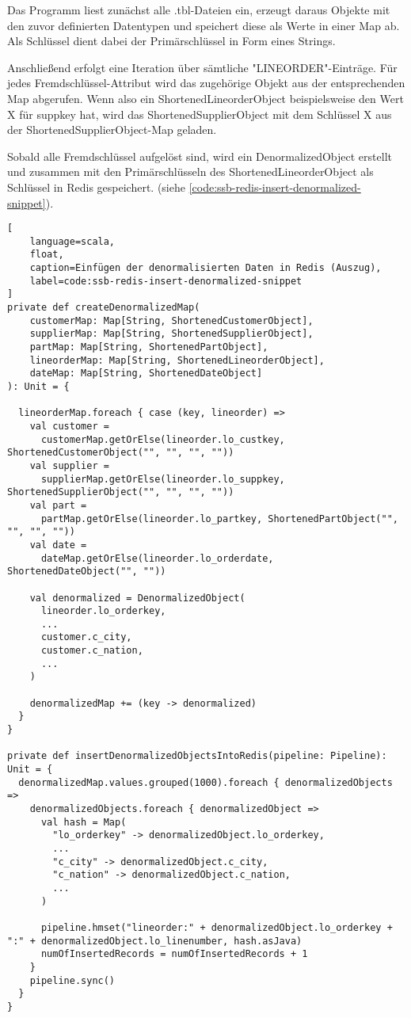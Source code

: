 Das Programm liest zunächst alle .tbl-Dateien ein, erzeugt daraus Objekte mit den zuvor definierten Datentypen und speichert diese als Werte in einer Map ab. Als Schlüssel dient dabei der Primärschlüssel in Form eines Strings.

Anschließend erfolgt eine Iteration über sämtliche "LINEORDER"-Einträge.
Für jedes Fremdschlüssel-Attribut wird das zugehörige Objekt aus der entsprechenden Map abgerufen.
Wenn also ein ShortenedLineorderObject beispielsweise den Wert X für suppkey hat, wird das ShortenedSupplierObject mit dem Schlüssel X aus der ShortenedSupplierObject-Map geladen.

Sobald alle Fremdschlüssel aufgelöst sind, wird ein DenormalizedObject erstellt und zusammen mit den Primärschlüsseln des ShortenedLineorderObject als Schlüssel in Redis gespeichert. (siehe \cref{code:ssb-redis-insert-denormalized-snippet}).


\begin{lstlisting}[
    language=scala,
    float,
    caption=Einfügen der denormalisierten Daten in Redis (Auszug),
    label=code:ssb-redis-insert-denormalized-snippet
]
private def createDenormalizedMap(
    customerMap: Map[String, ShortenedCustomerObject],
    supplierMap: Map[String, ShortenedSupplierObject],
    partMap: Map[String, ShortenedPartObject],
    lineorderMap: Map[String, ShortenedLineorderObject],
    dateMap: Map[String, ShortenedDateObject]
): Unit = {

  lineorderMap.foreach { case (key, lineorder) =>
    val customer = 
      customerMap.getOrElse(lineorder.lo_custkey, ShortenedCustomerObject("", "", "", ""))
    val supplier = 
      supplierMap.getOrElse(lineorder.lo_suppkey, ShortenedSupplierObject("", "", "", ""))
    val part = 
      partMap.getOrElse(lineorder.lo_partkey, ShortenedPartObject("", "", "", ""))
    val date = 
      dateMap.getOrElse(lineorder.lo_orderdate, ShortenedDateObject("", ""))

    val denormalized = DenormalizedObject(
      lineorder.lo_orderkey,
      ...
      customer.c_city,
      customer.c_nation,
      ...
    )

    denormalizedMap += (key -> denormalized)
  }
}

private def insertDenormalizedObjectsIntoRedis(pipeline: Pipeline): Unit = {
  denormalizedMap.values.grouped(1000).foreach { denormalizedObjects =>
    denormalizedObjects.foreach { denormalizedObject =>
      val hash = Map(
        "lo_orderkey" -> denormalizedObject.lo_orderkey,
        ...
        "c_city" -> denormalizedObject.c_city,
        "c_nation" -> denormalizedObject.c_nation,
        ...
      )

      pipeline.hmset("lineorder:" + denormalizedObject.lo_orderkey + ":" + denormalizedObject.lo_linenumber, hash.asJava)
      numOfInsertedRecords = numOfInsertedRecords + 1
    }
    pipeline.sync()
  }
}


\end{lstlisting}

